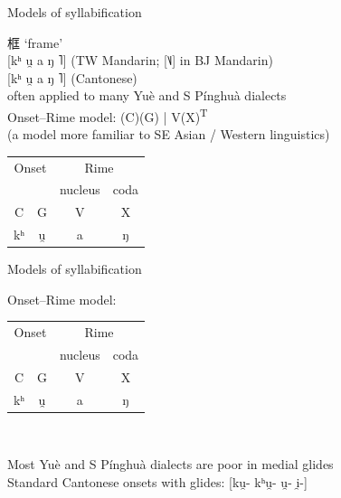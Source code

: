 \documentclass{beamer}
\begin{document}
\begin{frame}[fragile]{Models of syllabification}

框 \enquote*{frame}\\
\textcolor{gray!50}{{[}kʰ u̯ a ŋ ˥{]} (TW Mandarin; {[}˥˩{]} in BJ Mandarin)}\\
{[}kʰ u̯ a ŋ ˥{]} (Cantonese)\\
\bigskip
{\footnotesize often applied to many Yuè and S Pínghuà dialects}\\
Onset–Rime model: (C)(G) | V(X)\textsuperscript{T}\\ 
{\scriptsize (a model more familiar to SE Asian / Western linguistics)}\\
\medskip
\centering
\begin{tabular}{c c|c c}
    \hline
    \multicolumn{2}{c|}{Onset} & \multicolumn{2}{c}{Rime}\\
    & & {\scriptsize nucleus} & {\scriptsize coda}\\ \hline
    C & G & V & X\\
    kʰ & u̯ & a & ŋ\\ \hline
\end{tabular}

\end{frame}

\begin{frame}[fragile]{Models of syllabification}

Onset–Rime model:\\ 
\medskip
{\centering
\begin{tabular}{c c|c c}
    \hline
    \multicolumn{2}{c|}{Onset} & \multicolumn{2}{c}{Rime}\\
    & & {\scriptsize nucleus} & {\scriptsize coda}\\ \hline
    C & G & V & X\\
    kʰ & u̯ & a & ŋ\\ \hline
\end{tabular} \\}
\medskip
Most Yuè and S Pínghuà dialects are poor in medial glides\\
Standard Cantonese onsets with glides:
{[}ku̯- kʰu̯- u̯- i̯-{]}\\
\medskip

\end{frame}
\end{document}
